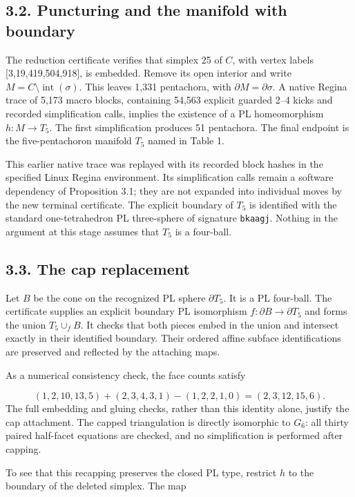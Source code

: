 \documentclass[11pt,letterpaper]{article}
\begin{document}
\subsection*{3.2. Puncturing and the manifold with boundary}
The reduction certificate verifies that simplex 25 of $C$, with vertex labels [3,19,419,504,918], is embedded. Remove its open interior and write $M=C\setminus\operatorname{int}(\sigma)$. This leaves 1,331 pentachora, with $\partial M=\partial\sigma$. A native Regina trace of 5,173 macro blocks, containing 54,563 explicit guarded 2--4 kicks and recorded simplification calls, implies the existence of a PL homeomorphism $h:M\longrightarrow T_5$. The first simplification produces 51 pentachora. The final endpoint is the five-pentachoron manifold $T_5$ named in Table 1.

This earlier native trace was replayed with its recorded block hashes in the specified Linux Regina environment. Its simplification calls remain a software dependency of Proposition 3.1; they are not expanded into individual moves by the new terminal certificate. The explicit boundary of $T_5$ is identified with the standard one-tetrahedron PL three-sphere of signature {\small\texttt{bkaagj}}. Nothing in the argument at this stage assumes that $T_5$ is a four-ball.

\subsection*{3.3. The cap replacement}
Let $B$ be the cone on the recognized PL sphere $\partial T_5$. It is a PL four-ball. The certificate supplies an explicit boundary PL isomorphism $f:\partial B\longrightarrow\partial T_5$ and forms the union $T_5\cup_f B$. It checks that both pieces embed in the union and intersect exactly in their identified boundary. Their ordered affine subface identifications are preserved and reflected by the attaching maps.

As a numerical consistency check, the face counts satisfy

\[
(1,2,10,13,5)+(2,3,4,3,1)-(1,2,2,1,0)=(2,3,12,15,6).
\]
The full embedding and gluing checks, rather than this identity alone, justify the cap attachment. The capped triangulation is directly isomorphic to $G_6$: all thirty paired half-facet equations are checked, and no simplification is performed after capping.

To see that this recapping preserves the closed PL type, restrict $h$ to the boundary of the deleted simplex. The map
\end{document}
